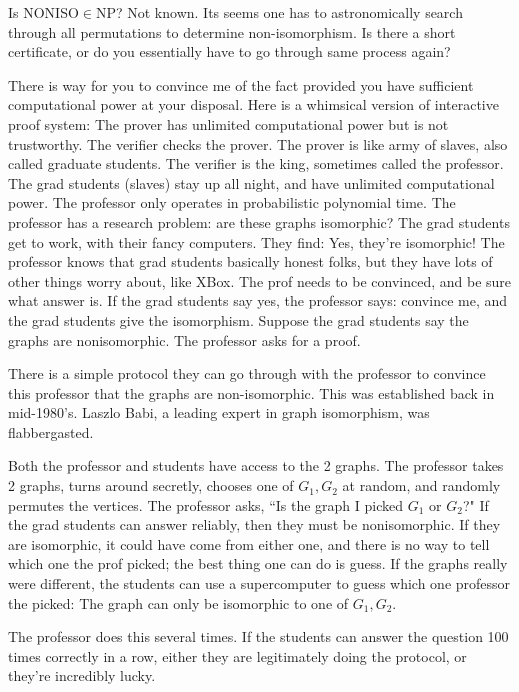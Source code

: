 Is NONISO$\in$NP? Not known. Its seems one has to astronomically search through all permutations to determine non-isomorphism. 
Is there a short certificate, or do you essentially have to go through same process again?

There is way for you to convince me of the fact provided you have sufficient computational power at your disposal. Here is a whimsical version of interactive proof system: The prover has unlimited computational power but is not trustworthy. The verifier checks the prover. The prover is like army of slaves, also called graduate students. The verifier is the king, sometimes called the professor. The grad students (slaves) stay up all night, and have unlimited computational power.
The professor only operates in probabilistic polynomial time. The professor has a research problem: are these graphs isomorphic? The grad students get to work, with their fancy computers. They find: Yes, they're isomorphic! The professor knows that grad students basically honest folks, but they have lots of other things worry about, like XBox. The prof needs to be convinced, and be sure what answer is. If the grad students say yes, the professor says: convince me, and the grad students give the isomorphism. Suppose the grad students say the graphs are nonisomorphic. The professor asks for a proof.

There is a simple protocol they can go through with the professor to  convince this professor that the graphs are non-isomorphic. This was established back in mid-1980's. Laszlo Babi, a leading expert in graph isomorphism, was flabbergasted.

Both the professor and students have access to the 2 graphs.
The professor takes 2 graphs, turns around secretly, chooses one of $G_1,G_2$ at random, and randomly permutes the vertices. The professor asks, ``Is the graph I picked $G_1$ or $G_2$?" If the grad students can answer reliably, then they must be nonisomorphic. If they are isomorphic, it could have come from either one, and there is no way to tell which one the prof picked; the best thing one can do is guess.
If the graphs really were different, the students can use a supercomputer to guess which one professor the picked: The graph can only be isomorphic to one of $G_1,G_2$.

The professor does this several times. If the students can answer the question 100 times correctly in a row, either they are legitimately doing the protocol, or they're incredibly lucky.

